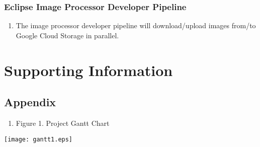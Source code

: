 \documentclass[10pt, onecolumn, draftclsnofoot, letterpaper, compsoc]{IEEEtran}
\begin{document}
\subsubsection{Eclipse Image Processor Developer Pipeline}
	\begin{enumerate}
		\item The image processor developer pipeline will download/upload images from/to Google
        Cloud Storage in parallel.
	\end{enumerate}

\newpage
\section{Supporting Information}

\subsection{Appendix}

\begin{enumerate}
	\item Figure 1. Project Gantt Chart
\end{enumerate}

\begin{center}
	\texttt{[image: gantt1.eps]}
\end{center}
\end{document}
